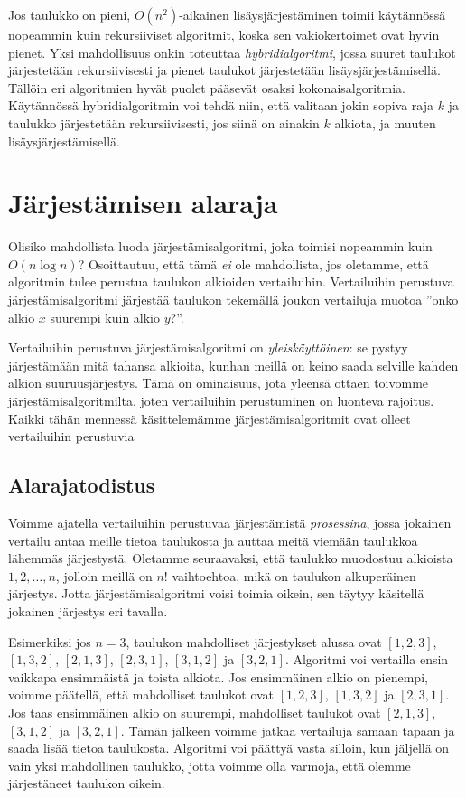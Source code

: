 
Jos taulukko on pieni, $O(n^2)$-aikainen lisäysjärjestäminen
toimii käytän\-nössä nopeammin kuin rekursiiviset algoritmit,
koska sen vakiokertoimet ovat hyvin pienet.
Yksi mahdollisuus onkin toteuttaa \emph{hybridialgoritmi},
jossa suuret taulukot järjes\-tetään rekursiivisesti
ja pienet taulukot järjes\-tetään lisäysjärjestämisellä.
Tällöin eri algoritmien hyvät puolet pääsevät osaksi
kokonaisalgoritmia.
Käytännössä hybridialgoritmin voi tehdä niin,
että valitaan jokin sopiva raja $k$ ja
taulukko järjestetään rekursiivisesti,
jos siinä on ainakin $k$ alkiota, ja muuten lisäysjärjestämisellä.

\section{Järjestämisen alaraja}

Olisiko mahdollista luoda järjestämisalgoritmi, joka toimisi
nopeammin kuin $O(n \log n)$?
Osoittautuu, että tämä \emph{ei} ole mahdollista,
jos oletamme, että algoritmin tulee perustua taulukon
alkioiden vertailuihin.
Vertailuihin perustuva järjestämisalgoritmi järjestää taulukon
tekemällä joukon vertailuja muotoa
''onko alkio $x$ suurempi kuin alkio $y$?''.

Vertailuihin perustuva järjestämisalgoritmi on \emph{yleiskäyttöinen}:
se pystyy järjestämään mitä tahansa alkioita,
kunhan meillä on keino saada selville kahden alkion suuruusjärjestys.
Tämä on ominaisuus, jota yleensä ottaen toivomme
järjestämisalgoritmilta, joten vertailuihin perustuminen
on luonteva rajoitus.
Kaikki tähän mennessä käsittelemämme järjestämisalgoritmit
ovat olleet vertailuihin perustuvia

\subsection{Alarajatodistus}

Voimme ajatella vertailuihin perustuvaa järjestämistä
\emph{prosessina}, jossa jokainen vertailu antaa meille tietoa
taulukosta ja auttaa meitä viemään taulukkoa lähemmäs järjestystä.
Oletamme seuraavaksi, että taulukko muodostuu alkioista
$1,2,\dots,n$, jolloin meillä on $n!$ vaihtoehtoa, mikä
on taulukon alkuperäinen järjestys.
Jotta järjestämisalgoritmi voisi toimia oikein,
sen täytyy käsitellä jokainen järjestys eri tavalla.

Esimerkiksi jos $n=3$, taulukon mahdolliset järjestykset alussa ovat
$[1,2,3]$, $[1,3,2]$, $[2,1,3]$, $[2,3,1]$, $[3,1,2]$ ja $[3,2,1]$.
Algoritmi voi vertailla ensin vaikkapa ensimmäistä ja toista alkiota.
Jos ensimmäinen alkio on pienempi, voimme päätellä,
että mahdolliset taulukot ovat $[1,2,3]$, $[1,3,2]$ ja $[2,3,1]$.
Jos taas ensimmäinen alkio on suurempi,
mahdolliset taulukot ovat $[2,1,3]$, $[3,1,2]$ ja $[3,2,1]$.
Tämän jälkeen voimme jatkaa vertailuja samaan tapaan
ja saada lisää tietoa taulukosta.
Algoritmi voi päättyä vasta silloin, kun jäljellä on vain yksi
mahdollinen taulukko, jotta voimme olla varmoja, että olemme
järjestäneet taulukon oikein.

